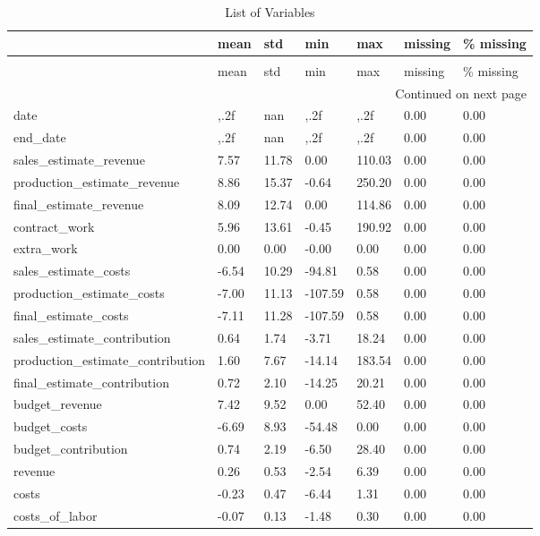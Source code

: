 \begin{landscape}\begin{longtable}[h!]{lllllll}
\caption{List of Variables} \label{eda_1} \\
\toprule
 & mean & std & min & max & missing & \% missing \\
\midrule
\endfirsthead
\caption[]{List of Variables} \\
\toprule
 & mean & std & min & max & missing & \% missing \\
\midrule
\endhead
\midrule
\multicolumn{7}{r}{Continued on next page} \\
\midrule
\endfoot
\bottomrule
\endlastfoot
date & ,.2f & nan & ,.2f & ,.2f & 0.00 & 0.00 \\
end_date & ,.2f & nan & ,.2f & ,.2f & 0.00 & 0.00 \\
sales_estimate_revenue & 7.57 & 11.78 & 0.00 & 110.03 & 0.00 & 0.00 \\
production_estimate_revenue & 8.86 & 15.37 & -0.64 & 250.20 & 0.00 & 0.00 \\
final_estimate_revenue & 8.09 & 12.74 & 0.00 & 114.86 & 0.00 & 0.00 \\
contract_work & 5.96 & 13.61 & -0.45 & 190.92 & 0.00 & 0.00 \\
extra_work & 0.00 & 0.00 & -0.00 & 0.00 & 0.00 & 0.00 \\
sales_estimate_costs & -6.54 & 10.29 & -94.81 & 0.58 & 0.00 & 0.00 \\
production_estimate_costs & -7.00 & 11.13 & -107.59 & 0.58 & 0.00 & 0.00 \\
final_estimate_costs & -7.11 & 11.28 & -107.59 & 0.58 & 0.00 & 0.00 \\
sales_estimate_contribution & 0.64 & 1.74 & -3.71 & 18.24 & 0.00 & 0.00 \\
production_estimate_contribution & 1.60 & 7.67 & -14.14 & 183.54 & 0.00 & 0.00 \\
final_estimate_contribution & 0.72 & 2.10 & -14.25 & 20.21 & 0.00 & 0.00 \\
budget_revenue & 7.42 & 9.52 & 0.00 & 52.40 & 0.00 & 0.00 \\
budget_costs & -6.69 & 8.93 & -54.48 & 0.00 & 0.00 & 0.00 \\
budget_contribution & 0.74 & 2.19 & -6.50 & 28.40 & 0.00 & 0.00 \\
revenue & 0.26 & 0.53 & -2.54 & 6.39 & 0.00 & 0.00 \\
costs & -0.23 & 0.47 & -6.44 & 1.31 & 0.00 & 0.00 \\
costs_of_labor & -0.07 & 0.13 & -1.48 & 0.30 & 0.00 & 0.00 \\

\end{longtable}
\end{landscape}
